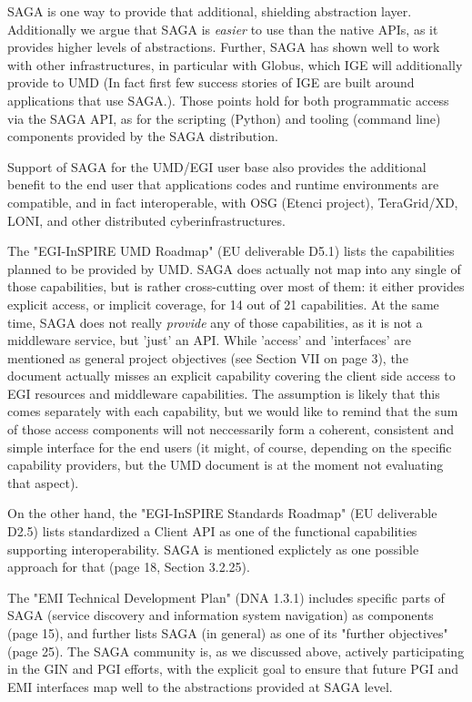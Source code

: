 \documentclass[12pt]{article}
\newcommand{\I}[1]{\textit{#1}}
\begin{document}
 SAGA is one way to provide that additional, shielding abstraction
 layer.  Additionally we argue that SAGA is \I{easier} to use than the
 native APIs, as it provides higher levels of abstractions.  Further,
 SAGA has shown well to work with other infrastructures, in particular
 with Globus, which IGE will additionally provide to UMD (In fact
 first few success stories of IGE are built around applications that
 use SAGA.).  Those points hold for both programmatic access via the
 SAGA API, as for the scripting (Python) and tooling (command line)
 components provided by the SAGA distribution.

 Support of SAGA for the UMD/EGI user base also provides the
 additional benefit to the end user that applications codes and
 runtime environments are compatible, and in fact interoperable, with
 OSG (Etenci project), TeraGrid/XD, LONI, and other distributed
 cyberinfrastructures.

 The "EGI-InSPIRE UMD Roadmap" (EU deliverable D5.1) lists the
 capabilities planned to be provided by UMD.  SAGA does actually not
 map into any single of those capabilities, but is rather
 cross-cutting over most of them: it either provides explicit access,
 or implicit coverage, for 14 out of 21 capabilities.  At the same
 time, SAGA does not really \I{provide} any of those capabilities, as
 it is not a middleware service, but 'just' an API.  While 'access'
 and 'interfaces' are mentioned as general project objectives (see
 Section VII on page 3), the document actually misses an explicit
 capability covering the client side access to EGI resources and
 middleware capabilities.  The assumption is likely that this comes
 separately with each capability, but we would like to remind that the
 sum of those access components will not neccessarily form a coherent,
 consistent and simple interface for the end users (it might, of
 course, depending on the specific capability providers, but the UMD
 document is at the moment not evaluating that aspect).

 On the other hand, the "EGI-InSPIRE Standards Roadmap" (EU
 deliverable D2.5) lists standardized a Client API as one of the
 functional capabilities supporting interoperability.  SAGA is
 mentioned explictely as one possible approach for that (page 18,
 Section 3.2.25).

 The "EMI Technical Development Plan" (DNA 1.3.1) includes specific
 parts of SAGA (service discovery and information system navigation)
 as components (page 15), and further lists SAGA (in general) as one
 of its "further objectives" (page 25).  The SAGA community is, as we
 discussed above, actively participating in the GIN and PGI efforts,
 with the explicit goal to ensure that future PGI and EMI interfaces
 map well to the abstractions provided at SAGA level.
\end{document}
